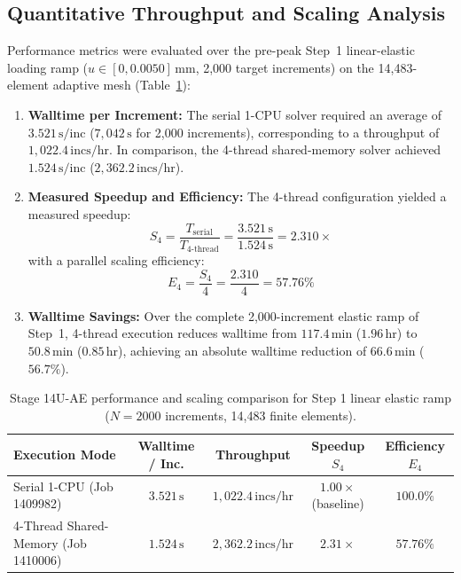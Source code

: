 \subsection{Quantitative Throughput and Scaling Analysis}
\label{subsec:stage14uae_throughput}

Performance metrics were evaluated over the pre-peak Step~1 linear-elastic loading ramp ($u \in [0, 0.0050]\,\mathrm{mm}$, 2,000 target increments) on the 14,483-element adaptive mesh (Table~\ref{tab:stage14uae_performance_summary}):
\begin{enumerate}
  \item \textbf{Walltime per Increment:} The serial 1-CPU solver required an average of $3.521\,\mathrm{s/inc}$ ($7,042\,\mathrm{s}$ for 2,000 increments), corresponding to a throughput of $1,022.4\,\mathrm{incs/hr}$. In comparison, the 4-thread shared-memory solver achieved $1.524\,\mathrm{s/inc}$ ($2,362.2\,\mathrm{incs/hr}$).
  \item \textbf{Measured Speedup and Efficiency:} The 4-thread configuration yielded a measured speedup:
  \begin{equation}
    S_4 = \frac{T_{\text{serial}}}{T_{\text{4-thread}}} = \frac{3.521\,\mathrm{s}}{1.524\,\mathrm{s}} = 2.310\times
  \end{equation}
  with a parallel scaling efficiency:
  \begin{equation}
    E_4 = \frac{S_4}{4} = \frac{2.310}{4} = 57.76\%
  \end{equation}
  \item \textbf{Walltime Savings:} Over the complete 2,000-increment elastic ramp of Step~1, 4-thread execution reduces walltime from $117.4\,\mathrm{min}$ ($1.96\,\mathrm{hr}$) to $50.8\,\mathrm{min}$ ($0.85\,\mathrm{hr}$), achieving an absolute walltime reduction of $66.6\,\mathrm{min}$ ($56.7\%$).
\end{enumerate}

\begin{table}[t!]
\centering
\caption{Stage 14U-AE performance and scaling comparison for Step 1 linear elastic ramp ($N=2000$ increments, 14,483 finite elements).}
\label{tab:stage14uae_performance_summary}
\begin{tabular}{lcccc}
\hline
\textbf{Execution Mode} & \textbf{Walltime / Inc.} & \textbf{Throughput} & \textbf{Speedup $S_4$} & \textbf{Efficiency $E_4$} \\
\hline
Serial 1-CPU (Job 1409982) & $3.521\,\mathrm{s}$ & $1,022.4\,\mathrm{incs/hr}$ & $1.00\times$ (baseline) & $100.0\%$ \\
4-Thread Shared-Memory (Job 1410006) & $1.524\,\mathrm{s}$ & $2,362.2\,\mathrm{incs/hr}$ & $\mathbf{2.31\times}$ & $\mathbf{57.76\%}$ \\
\hline
\end{tabular}
\end{table}

